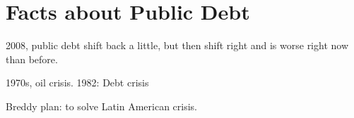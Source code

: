 \section{Facts about Public Debt}

2008, public debt shift back a little, but then shift right and is worse right now than before.

1970s, oil crisis. 1982: Debt crisis

Breddy plan: to solve Latin American crisis.

